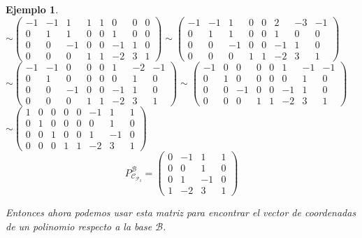 \documentclass[12pt]{book}
\newtheorem{ejem}{Ejemplo}
\def\P{\mathcal{P}}
\def\B{\mathcal{B}}
\def\Ccal{\mathcal{C}}
\begin{document}
\begin{ejem}
{{$
\sim
\left(\begin{array}{rrrr|rrrr}
-1&-1&1&1&1&0&0&0\\
0&1&1&0&0&1&0&0\\
0&0&-1&0&0&-1&1&0\\
0&0&0&1&1&-2&3&1
\end{array}\right)
\sim
\left(\begin{array}{rrrr|rrrr}
-1&-1&1&0&0&2&-3&-1\\
0&1&1&0&0&1&0&0\\
0&0&-1&0&0&-1&1&0\\
0&0&0&1&1&-2&3&1
\end{array}\right)
$\\

$
\sim
\left(\begin{array}{rrrr|rrrr}
-1&-1&0&0&0&1&-2&-1\\
0&1&0&0&0&0&1&0\\
0&0&-1&0&0&-1&1&0\\
0&0&0&1&1&-2&3&1
\end{array}\right)
\sim
\left(\begin{array}{rrrr|rrrr}
-1&0&0&0&0&1&-1&-1\\
0&1&0&0&0&0&1&0\\
0&0&-1&0&0&-1&1&0\\
0&0&0&1&1&-2&3&1
\end{array}\right)
$\\

$
\sim
\left(\begin{array}{rrrr|rrrr}
1&0&0&0&0&-1&1&1\\
0&1&0&0&0&0&1&0\\
0&0&1&0&0&1&-1&0\\
0&0&0&1&1&-2&3&1
\end{array}\right)
$
$$
P_{\Ccal_{\P_3}}^{\B} = 
\left(\begin{array}{rrrr}
0&-1&1&1\\
0&0&1&0\\
0&1&-1&0\\
1&-2&3&1
\end{array}\right)
$$
}

Entonces ahora podemos usar esta matriz para encontrar el vector de coordenadas de un polinomio respecto a la base $\B$.

}
\end{ejem}
\end{document}

